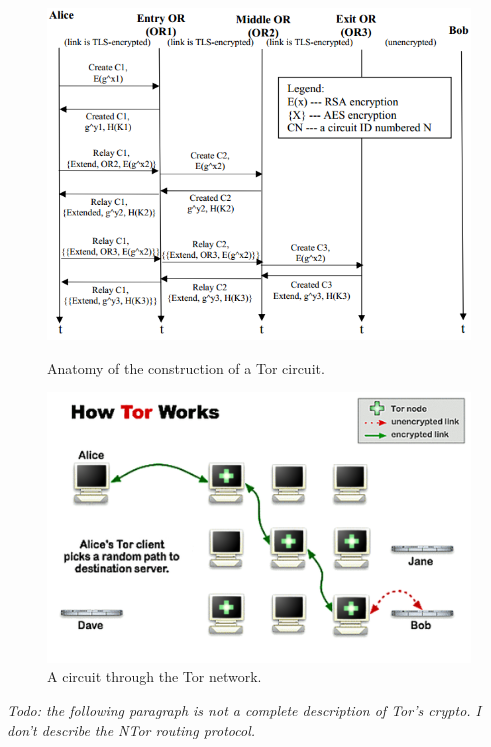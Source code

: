 \begin{figure}[htdp]
	\begin{minipage}[b]{0.45\linewidth}
		\centering
		\includegraphics[width=\textwidth]{images/Tor/circuit-construction.png}
		\caption{Anatomy of the construction of a Tor circuit.}
		\label{fig:figure1}
	\end{minipage}
	\hspace{0.5cm}
	\begin{minipage}[b]{0.45\linewidth}
		\centering
		\includegraphics[width=\textwidth]{images/Tor/circuit-building-2-5.png}
		\caption{A circuit through the Tor network.}
		\label{fig:figure2}
	\end{minipage}
\end{figure}

\textit{Todo: the following paragraph is not a complete description of Tor's crypto. I don't describe the NTor routing protocol.}

